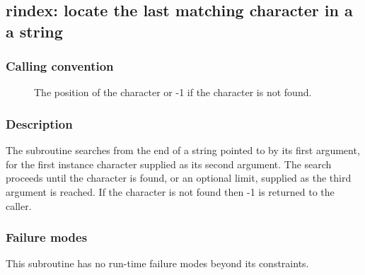 \clearpage
{}
{}
\label{subr:rindex}
\subsection*{rindex: locate the last matching character in a a string}

\subsubsection*{Calling convention}

\begin{description}
\item[] The position of the character or -1 if the
  character is not found.
\end{description}

\subsubsection*{Description}

The  subroutine searches from the end of a string
pointed to by its first argument, for the first instance character
supplied as its second argument.  The search proceeds until the
character is found, or an optional limit, supplied as the third
argument is reached.  If the character is not found then -1 is
returned to the caller.

\subsubsection*{Failure modes}

This subroutine has no run-time failure modes beyond its constraints.
